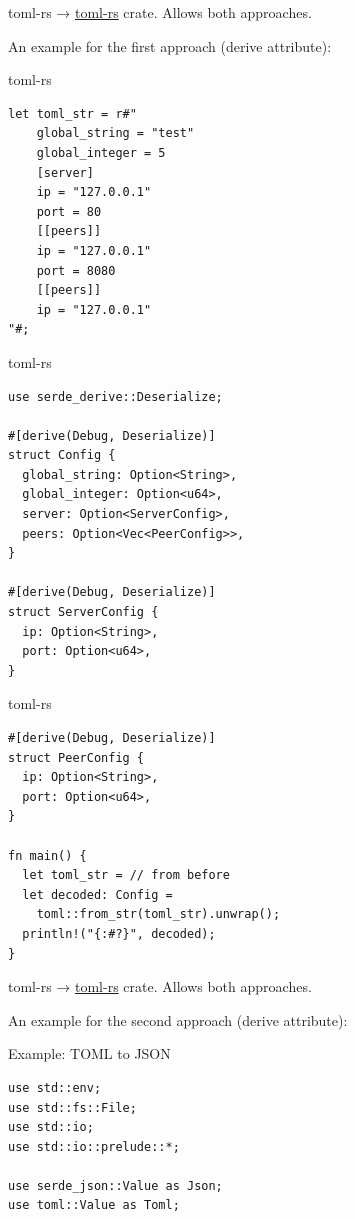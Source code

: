 \documentclass{beamer}
\begin{document}
\begin{frame}[fragile]{toml-rs}
  → \href{https://github.com/alexcrichton/toml-rs}{toml-rs} crate. Allows both approaches.

  An example for the first approach (derive attribute):
\end{frame}

\begin{frame}[fragile]{toml-rs}
  \begin{verbatim}
let toml_str = r#"
    global_string = "test"
    global_integer = 5
    [server]
    ip = "127.0.0.1"
    port = 80
    [[peers]]
    ip = "127.0.0.1"
    port = 8080
    [[peers]]
    ip = "127.0.0.1"
"#;
  \end{verbatim}
\end{frame}

\begin{frame}[fragile]{toml-rs}
  \begin{verbatim}
use serde_derive::Deserialize;

#[derive(Debug, Deserialize)]
struct Config {
  global_string: Option<String>,
  global_integer: Option<u64>,
  server: Option<ServerConfig>,
  peers: Option<Vec<PeerConfig>>,
}

#[derive(Debug, Deserialize)]
struct ServerConfig {
  ip: Option<String>,
  port: Option<u64>,
}
  \end{verbatim}
\end{frame}

\begin{frame}[fragile]{toml-rs}
  \begin{verbatim}
#[derive(Debug, Deserialize)]
struct PeerConfig {
  ip: Option<String>,
  port: Option<u64>,
}

fn main() {
  let toml_str = // from before
  let decoded: Config =
    toml::from_str(toml_str).unwrap();
  println!("{:#?}", decoded);
}
  \end{verbatim}
\end{frame}

\begin{frame}[fragile]{toml-rs}
  → \href{https://github.com/alexcrichton/toml-rs}{toml-rs} crate. Allows both approaches.

  An example for the second approach (derive attribute):
\end{frame}

\begin{frame}[fragile]{Example: TOML to JSON}
  \begin{verbatim}
use std::env;
use std::fs::File;
use std::io;
use std::io::prelude::*;

use serde_json::Value as Json;
use toml::Value as Toml;
  \end{verbatim}
\end{frame}
\end{document}
